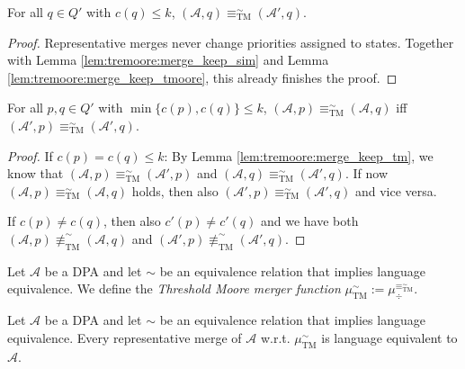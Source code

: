 \begin{lem}
	For all $q \in Q'$ with $c(q) \leq k$, $(\mathcal{A}, q) \equiv^\sim_\text{TM} (\mathcal{A}', q)$.
	\label{lem:tremoore:merge_keep_tm}
\end{lem}

\begin{proof}
	Representative merges never change priorities assigned to states. Together with Lemma \ref{lem:tremoore:merge_keep_sim} and Lemma \ref{lem:tremoore:merge_keep_tmoore}, this already finishes the proof.
\end{proof}

\begin{lem}
	For all $p, q \in Q'$ with $\min \{c(p), c(q)\} \leq k$, $(\mathcal{A}, p) \equiv^\sim_\text{TM} (\mathcal{A}, q)$ iff \linebreak $(\mathcal{A}', p) \equiv^\sim_\text{TM} (\mathcal{A}', q)$.
	\label{lem:tremoore:merge_changes_only_higher}
\end{lem}

\begin{proof}
	If $c(p) = c(q) \leq k$: By Lemma \ref{lem:tremoore:merge_keep_tm}, we know that $(\mathcal{A}, p) \equiv^\sim_\text{TM} (\mathcal{A}', p)$ and $(\mathcal{A}, q) \equiv^\sim_\text{TM} (\mathcal{A}', q)$. If now $(\mathcal{A}, p) \equiv^\sim_\text{TM} (\mathcal{A}, q)$ holds, then also $(\mathcal{A}', p) \equiv^\sim_\text{TM} (\mathcal{A}', q)$ and vice versa.
	
	If $c(p) \neq c(q)$, then also $c'(p) \neq c'(q)$ and we have both $(\mathcal{A}, p) \not\equiv^\sim_\text{TM} (\mathcal{A}, q)$ and $(\mathcal{A}', p) \not\equiv^\sim_\text{TM} (\mathcal{A}', q)$.
\end{proof}

\vspace{10pt}

\begin{defn}
	Let $\mathcal{A}$ be a DPA and let $\sim$ be an equivalence relation that implies language equivalence. We define the \emph{Threshold Moore merger function} $\mu_\text{TM}^\sim := \mu_\div^{\equiv^\sim_\text{TM}}$.
\end{defn}

\begin{theorem}
	Let $\mathcal{A}$ be a DPA and let $\sim$ be an equivalence relation that implies language equivalence. Every representative merge of $\mathcal{A}$ w.r.t. $\mu_\text{TM}^\sim$ is language equivalent to $\mathcal{A}$.
\end{theorem}

